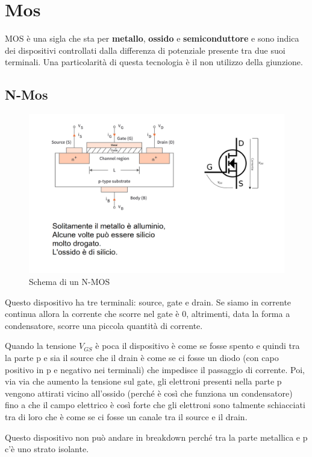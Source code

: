 \documentclass[
]{book}
\begin{document}
\section{Mos}\label{mos}

MOS è una sigla che sta per \textbf{metallo}, \textbf{ossido} e
\textbf{semiconduttore} e sono indica dei dispositivi controllati dalla
differenza di potenziale presente tra due suoi terminali. Una
particolarità di questa tecnologia è il non utilizzo della giunzione.

\subsection{N-Mos}\label{n-mos}

\begin{figure}
\centering
\includegraphics[width=0.7\linewidth,height=\textheight,keepaspectratio]{immagini/14.png}
\caption{Schema di un N-MOS}
\end{figure}

Questo dispositivo ha tre terminali: source, gate e drain. Se siamo in
corrente continua allora la corrente che scorre nel gate è 0,
altrimenti, data la forma a condensatore, scorre una piccola quantità di
corrente.

Quando la tensione \(V_{GS}\) è poca il dispositivo è come se fosse
spento e quindi tra la parte p e sia il source che il drain è come se ci
fosse un diodo (con capo positivo in p e negativo nei terminali) che
impedisce il passaggio di corrente. Poi, via via che aumento la tensione
sul gate, gli elettroni presenti nella parte p vengono attirati vicino
all'ossido (perché è così che funziona un condensatore) fino a che il
campo elettrico è così forte che gli elettroni sono talmente schiacciati
tra di loro che è come se ci fosse un canale tra il source e il drain.

Questo dispositivo non può andare in breakdown perché tra la parte
metallica e p c'è uno strato isolante.
\end{document}
